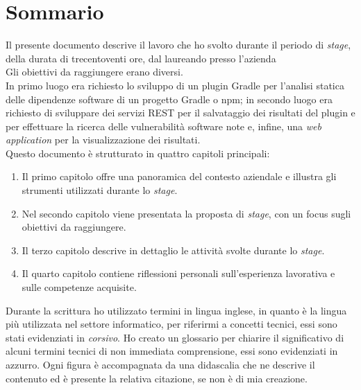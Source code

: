 \cleardoublepage
{}
{}
\begingroup
\let\clearpage\relax
\let\cleardoublepage\relax
\let\cleardoublepage\relax

\chapter*{Sommario}

Il presente documento descrive il lavoro che ho svolto durante il periodo di \textit{stage}, della durata di trecentoventi ore, dal laureando {\myName} presso l'azienda {\azienda} \\
Gli obiettivi da raggiungere erano diversi.\\
In primo luogo era richiesto lo sviluppo di un plugin Gradle per l'analisi statica delle dipendenze software di un progetto Gradle o npm;
in secondo luogo era richiesto di sviluppare dei servizi REST per il salvataggio dei risultati del plugin e per effettuare la ricerca
delle vulnerabilità software note e, infine,
una \textit{web application} per la visualizzazione dei risultati.\\
Questo documento è strutturato in quattro capitoli principali:
\begin{enumerate}
    \item Il primo capitolo offre una panoramica del contesto aziendale e illustra gli strumenti utilizzati durante lo \textit{stage}.
    \item Nel secondo capitolo viene presentata la proposta di \textit{stage}, con un focus sugli obiettivi da raggiungere.
    \item Il terzo capitolo descrive in dettaglio le attività svolte durante lo \textit{stage}.
    \item Il quarto capitolo contiene riflessioni personali sull'esperienza lavorativa e sulle competenze acquisite.
\end{enumerate}

\noindent Durante la scrittura ho utilizzato termini in lingua inglese, in quanto è la lingua più utilizzata nel settore informatico, per riferirmi a concetti tecnici, essi sono stati evidenziati in \textit{corsivo}.
Ho creato un glossario per chiarire il significativo di alcuni termini tecnici di non immediata comprensione, essi sono evidenziati in azzurro.
Ogni figura è accompagnata da una didascalia che ne descrive il contenuto ed è presente la relativa citazione, se non è di mia creazione.





\endgroup

\vfill
